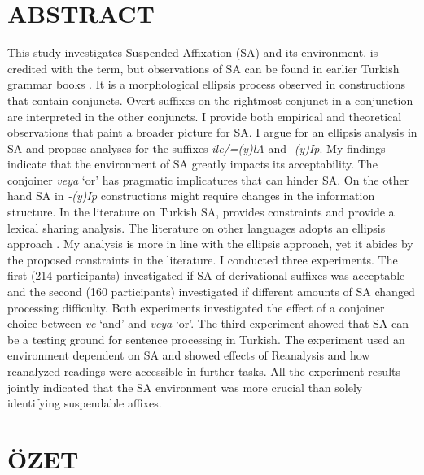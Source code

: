 \chapter*{ABSTRACT\\ \ttitle}

This study investigates Suspended Affixation (SA) and its environment. \citet{geoffrey1967turkish} is credited with the term, but observations of SA can be found in earlier Turkish grammar books \citep{emre1945turk,gencan1966dilbilgisi}. It is a morphological ellipsis process observed in constructions that contain conjuncts. Overt suffixes on the rightmost conjunct in a conjunction are interpreted in the other conjuncts. I provide both empirical and theoretical observations that paint a broader picture for SA. I argue for an ellipsis analysis in SA and propose analyses for the suffixes \textit{ile/=(y)lA} and \textit{-(y)Ip}. My findings indicate that the environment of SA greatly impacts its acceptability. The conjoiner \textit{veya} `or' has pragmatic implicatures that can hinder SA. On the other hand SA in \textit{-(y)Ip} constructions might require changes in the information structure. In the literature on Turkish SA, \citet{kabak2007turkish} provides constraints and \citet{orgun1995flat,kornfilt2012revisiting,broadwell2008turkish} provide a lexical sharing analysis. The literature on other languages adopts an ellipsis approach \citep{guseva2017postsyntactic,erschler2018suspended}. My analysis is more in line with the ellipsis approach, yet it abides by the proposed constraints in the literature. I conducted three experiments. The first (214 participants) investigated if SA of derivational suffixes was acceptable and the second (160 participants) investigated if different amounts of SA changed processing difficulty. Both experiments investigated the effect of a conjoiner choice between \textit{ve} `and' and \textit{veya} `or'. The third experiment showed that SA can be a testing ground for sentence processing in Turkish. The experiment used an environment dependent on SA and showed effects of Reanalysis and how reanalyzed readings were accessible in further tasks. All the experiment results jointly indicated that the SA environment was more crucial than solely identifying suspendable affixes.  

\newpage

\chapter*{ÖZET\\ \ttitletr}

